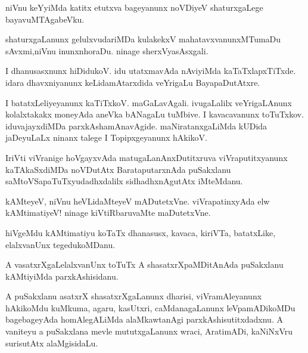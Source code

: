 \documentclass{article}
\begin{document}
\begin{mn}%
niVnu keYyiMda katitx etutxva bageyanunx noVDiyeV shaturxgaLege bayavuMTAgabeVku.
\end{mn}

\begin{mn}%
shaturxgaLanunx gelulxvudariMDa kulakekxV mahatavxvanunxMTumaDu sAvxmi,niVnu inunxnhoraDu.
ninage sherxVyasAsxgali.
\end{mn}

\begin{mn}%
I dhanusasxnunx hiDidukoV. idu utatxmavAda nAviyiMda kaTaTxlapxTiTxde. idara dhavxniyanunx 
keLidamAtarxdida veYrigaLu BayapaDutAtxre. 
\end{mn}

\begin{mn}%
I batatxLeliyeyanunx kaTiTxkoV. maGaLavAgali. ivugaLalilx veYrigaLAnunx kolalxtakakx 
moneyAda aneVka bANagaLu tuMbive. I kavacavanunx toTuTxkov. iduvajayxdiMDa 
parxkAshamAnavAgide. maNiratanxgaLiMda kUDida jaDeyuLaLx ninanx talege I Topipxgeyanunx 
hAkikoV. 
\end{mn}

\begin{mn}%
IriVti viVranige hoVgayxvAda matugaLanAnxDutitxruva viVraputitxyanunx kaTAkaSxdiMDa 
noVDutAtx BarataputarxnAda puSakxlanu saMtoVSapaTuTxyudadhxdalilx sidhadhxnAgutAtx iMteMdanu.
\end{mn}

\begin{mn}%
kAMteyeV, niVnu heVLidaMteyeV mADutetxVne. viVrapatinxyAda elw kAMtimatiyeV! ninage 
kiVtiRbaruvaMte maDutetxVne.
\end{mn}

\begin{mn}%
hiVgeMdu kAMtimatiyu koTaTx dhanasusx, kavaca, kiriVTa,  batatxLike, elalxvanUnx 
tegedukoMDanu.
\end{mn}

\begin{mn}%
A vasatxrXgaLelalxvanUnx toTuTx A shasatxrXpaMDitAnAda puSakxlanu kAMtiyiMda parxkAshisidanu.
\end{mn}

\begin{mn}%
A puSakxlanu asatxrX shasatxrXgaLanunx dharisi, viVramAleyanunx hAkikoMdu kuMkuma, agaru, 
kasUtxri, caMdanagaLanunx leVpamADikoMDu bagebageyAda homAlegALiMda alaMkawtanAgi 
parxkAshisutitxdadxnu. A vaniteyu a puSakxlana mevle mututxgaLanunx wraci, AratimADi, 
kaNiNxVru surisutAtx alaMgisidaLu.
\end{mn}
\end{document}
